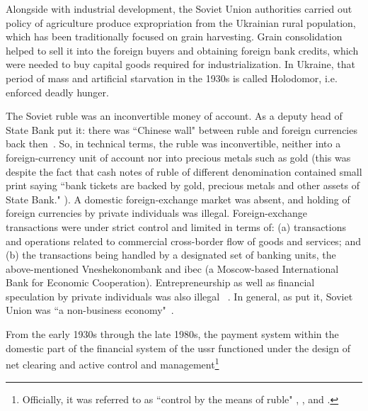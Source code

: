 Alongside with industrial development, the Soviet Union authorities
carried out policy of agriculture produce expropriation from the
Ukrainian rural population, which has been traditionally focused on
grain harvesting. Grain consolidation helped to sell it into the foreign
buyers and obtaining foreign bank credits, which were needed to buy
capital goods required for industrialization. In Ukraine, that period of
mass and artificial starvation in the 1930s is called Holodomor, i.e.
enforced deadly hunger.

The Soviet ruble was an inconvertible money of account. As a deputy
head of State Bank put it: there was ``Chinese wall" between ruble and
foreign currencies back then~\citep[p.~19]{krotov2008b}. So, in technical
terms, the ruble was inconvertible, neither into a foreign-currency unit
of account nor into precious metals such as gold (this was despite the
fact that cash notes of ruble of different denomination contained small
print saying ``bank tickets are backed by gold, precious metals and other
assets of State Bank." ). A domestic foreign-exchange market was absent,
and holding of foreign currencies by private individuals was illegal.
Foreign-exchange transactions were under strict control and limited in
terms of: (a) transactions and operations related to commercial
cross-border flow of goods and services; and (b) the transactions being
handled by a designated set of banking units, the above-mentioned
Vneshekonombank and \ac{ibec} (a Moscow-based International Bank for Economic
Cooperation). Entrepreneurship as well as financial speculation by
private individuals was also illegal ~\citep[p.~48]{bashkirova2012}. In general, as \citeauthor{dillard1967} put it, Soviet Union was ``a non-business economy"~\citep[p.~633]{dillard1967}.

From the early 1930s through the late 1980s, the payment system within the domestic part of the financial system of the \ac{ussr} functioned under the design of net clearing and active control and management\footnote{Officially, it was referred to as ``control by the means of ruble" \citep[p.~8]{usoskin1946}, \citep[pp.~99-110]{cbr2010}, and \citep[pp.~12-26]{krotov2008b}.} 



